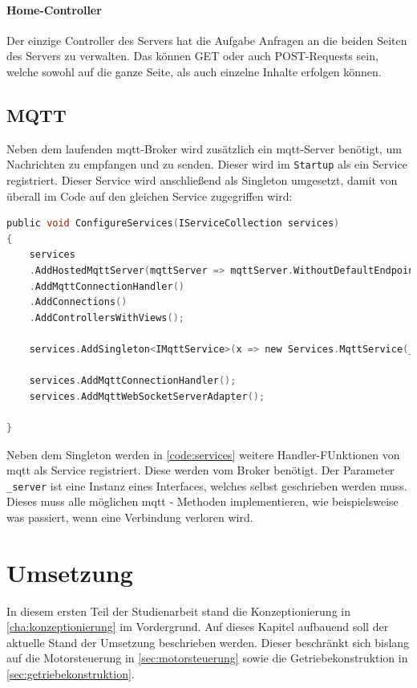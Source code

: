 \subsubsection{Home-Controller}
Der einzige Controller des Servers hat die Aufgabe Anfragen an die beiden Seiten des Servers zu verwalten. Das können GET oder auch POST-Requests sein, welche sowohl auf die ganze Seite, als auch einzelne Inhalte erfolgen können.

\section{MQTT}
\label{sec:serverMqtt}
Neben dem laufenden \acrshort{mqtt}-Broker wird zusätzlich ein \acrshort{mqtt}-Server benötigt, um Nachrichten zu empfangen und zu senden. Dieser wird im \texttt{Startup} als ein Service registriert. Dieser Service wird anschließend als Singleton umgesetzt, damit von überall im Code auf den gleichen Service zugegriffen wird:

\begin{lstlisting}[language=c, style=dhpaperdefault]
public void ConfigureServices(IServiceCollection services)
{
	services
	.AddHostedMqttServer(mqttServer => mqttServer.WithoutDefaultEndpoint())
	.AddMqttConnectionHandler()
	.AddConnections()
	.AddControllersWithViews();

	services.AddSingleton<IMqttService>(x => new Services.MqttService(_server));

	services.AddMqttConnectionHandler();
	services.AddMqttWebSocketServerAdapter();

}
\end{lstlisting}

Neben dem Singleton werden in \autoref{code:services} weitere Handler-FUnktionen von \acrshort{mqtt} als Service registriert. Diese werden vom Broker benötigt. Der Parameter \texttt{\_server} ist eine Instanz eines Interfaces, welches selbst geschrieben werden muss. Dieses muss alle möglichen \acrshort{mqtt} - Methoden implementieren, wie beispielsweise was passiert, wenn eine Verbindung verloren wird.

\chapter{Umsetzung} 
\label{cha:umsetzung}
In diesem ersten Teil der Studienarbeit stand die Konzeptionierung in \autoref{cha:konzeptionierung} im Vordergrund. Auf dieses Kapitel aufbauend soll der aktuelle Stand der Umsetzung beschrieben werden. Dieser beschränkt sich bislang auf die Motorsteuerung in \autoref{sec:motorsteuerung} sowie die Getriebekonstruktion in \autoref{sec:getriebekonstruktion}.
\newpage
 
